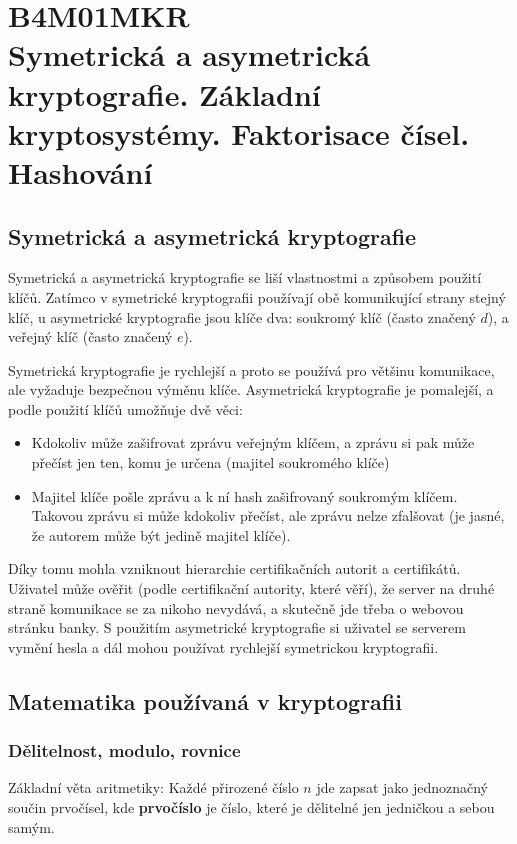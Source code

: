 \chapter[Matematická kryptografie]{B4M01MKR \\[1ex]\Large{Symetrická a asymetrická kryptografie. Základní kryptosystémy. Faktorisace čísel. Hashování}}

\section{Symetrická a asymetrická kryptografie}
Symetrická a asymetrická kryptografie se liší vlastnostmi a způsobem použití
klíčů. Zatímco v symetrické kryptografii používají obě komunikující strany
stejný klíč, u asymetrické kryptografie jsou klíče dva: soukromý klíč (často
značený $d$), a veřejný klíč (často značený $e$).

Symetrická kryptografie je rychlejší a proto se používá pro většinu komunikace,
ale vyžaduje bezpečnou výměnu klíče. Asymetrická kryptografie je pomalejší, a
podle použití klíčů umožňuje dvě věci:
\begin{itemize}
\item Kdokoliv může zašifrovat zprávu veřejným klíčem, a zprávu si pak může
přečíst jen ten, komu je určena (majitel soukromého klíče)
\item Majitel klíče pošle zprávu a k ní hash zašifrovaný soukromým klíčem.
Takovou zprávu si může kdokoliv přečíst, ale zprávu nelze zfalšovat (je jasné,
že autorem může být jedině majitel klíče).
\end{itemize}

Díky tomu mohla vzniknout hierarchie certifikačních autorit a certifikátů.
Uživatel může ověřit (podle certifikační autority, které věří), že server na
druhé straně komunikace se za nikoho nevydává, a skutečně jde třeba o webovou
stránku banky. S použitím asymetrické kryptografie si uživatel se serverem
vymění hesla a dál mohou používat rychlejší symetrickou kryptografii.

\section{Matematika používaná v kryptografii}
\subsection{Dělitelnost, modulo, rovnice}

Základní věta aritmetiky: Každé přirozené číslo $n$ jde zapsat jako jednoznačný
součin prvočísel, kde \textbf{prvočíslo} je číslo, které je dělitelné jen
jedničkou a sebou samým.

